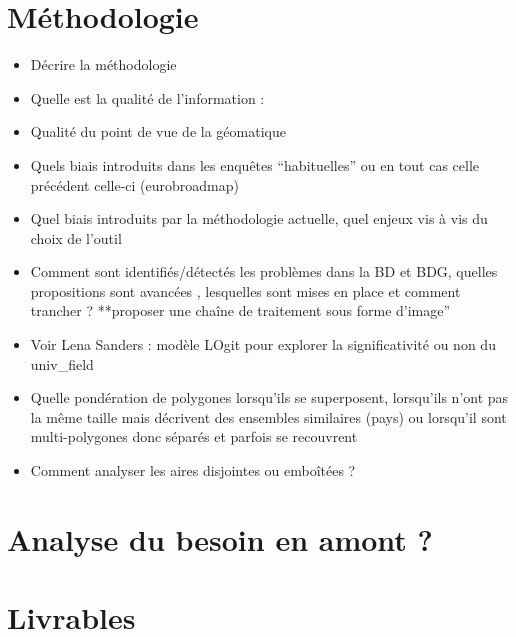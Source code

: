 \documentclass[
  a4paper,
]{scrbook}
\providecommand{\tightlist}{%
  \setlength{\itemsep}{0pt}\setlength{\parskip}{0pt}}\usepackage{longtable,booktabs,array}
\begin{document}
\hypertarget{muxe9thodologie}{%
\section{Méthodologie}\label{muxe9thodologie}}

\begin{itemize}
\tightlist
\item
  Décrire la méthodologie
\item
  Quelle est la qualité de l'information :
\item
  Qualité du point de vue de la géomatique
\item
  Quels biais introduits dans les enquêtes ``habituelles'' ou en tout
  cas celle précédent celle-ci (eurobroadmap)
\item
  Quel biais introduits par la méthodologie actuelle, quel enjeux vis à
  vis du choix de l'outil
\item
  Comment sont identifiés/détectés les problèmes dans la BD et BDG,
  quelles propositions sont avancées , lesquelles sont mises en place et
  comment trancher ? **proposer une chaîne de traitement sous forme
  d'image''
\item
  Voir Lena Sanders : modèle LOgit pour explorer la significativité ou
  non du univ\_field
\item
  Quelle pondération de polygones lorsqu'ils se superposent, lorsqu'ils
  n'ont pas la même taille mais décrivent des ensembles similaires
  (pays) ou lorsqu'il sont multi-polygones donc séparés et parfois se
  recouvrent
\item
  Comment analyser les aires disjointes ou emboîtées ?
\end{itemize}

\hypertarget{analyse-du-besoin-en-amont}{%
\section{Analyse du besoin en amont
?}\label{analyse-du-besoin-en-amont}}

\hypertarget{livrables}{%
\section{Livrables}\label{livrables}}
\end{document}
